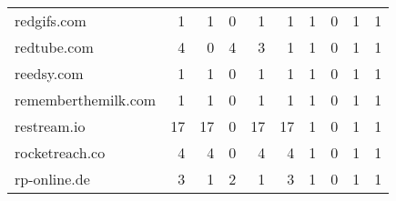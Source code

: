 \begin{tabular}{lrrrrrrrrr}
                redgifs.com &                                1 &                                  1 &                                      0 &                            1 &                           1 &                                   1 &                                      0 &                             1 &                            1 \\
                redtube.com &                                4 &                                  0 &                                      4 &                            3 &                           1 &                                   1 &                                      0 &                             1 &                            1 \\
                 reedsy.com &                                1 &                                  1 &                                      0 &                            1 &                           1 &                                   1 &                                      0 &                             1 &                            1 \\
        rememberthemilk.com &                                1 &                                  1 &                                      0 &                            1 &                           1 &                                   1 &                                      0 &                             1 &                            1 \\
                restream.io &                               17 &                                 17 &                                      0 &                           17 &                          17 &                                   1 &                                      0 &                             1 &                            1 \\
             rocketreach.co &                                4 &                                  4 &                                      0 &                            4 &                           4 &                                   1 &                                      0 &                             1 &                            1 \\
               rp-online.de &                                3 &                                  1 &                                      2 &                            1 &                           3 &                                   1 &                                      0 &                             1 &                            1 \\

\end{tabular}

